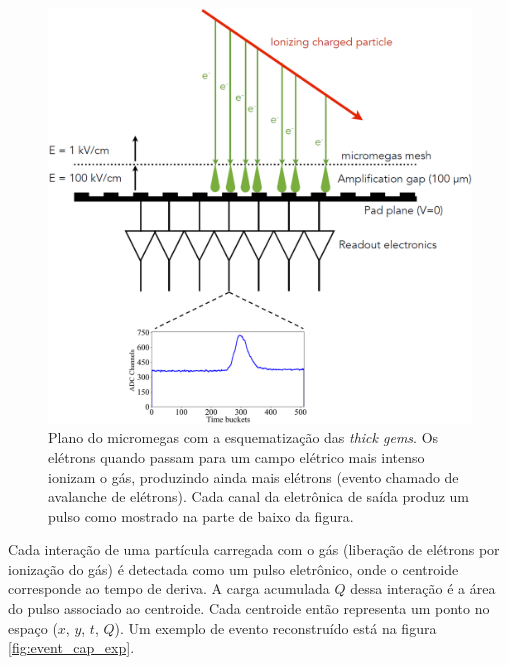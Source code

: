 \documentclass[a4paper,12pt,oneside]{book}
\begin{document}
\begin{figure}[H]
    \centering
    \includegraphics[scale = 0.40]{figs/thick_gems_2.png}
    \caption{Plano do micromegas com a esquematização das \textit{thick gems}. Os elétrons quando passam para um campo elétrico mais intenso ionizam o gás, produzindo ainda mais elétrons (evento chamado de avalanche de elétrons). Cada canal da eletrônica de saída produz um pulso como mostrado na parte de baixo da figura.}
    \label{fig:thick_gems}
\end{figure}


\par Cada interação de uma partícula carregada com o gás (liberação de elétrons por ionização do gás) é detectada como um pulso eletrônico, onde o centroide corresponde ao tempo de deriva. A carga acumulada $Q$ dessa interação é a área do pulso associado ao centroide. Cada centroide então representa um ponto no espaço ($x$, $y$, $t$, $Q$). Um exemplo de evento reconstruído está na figura \ref{fig:event_cap_exp}.
\end{document}
